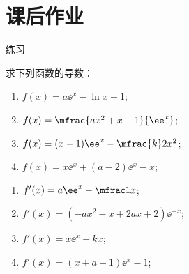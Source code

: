 \newpage
\section{课后作业}
  \begin{exercise}{\heiti 练习}
    \item 求下列函数的导数： \begin{multicols}{2}
          \begin{enumerate}[label=\arabic*)]
            \item $f(x)=a\ee^x-\ln x-1$;
            \vspace{2cm}
            \item $f(x)=\mfrac{ax^2+x-1}{\ee^x}$;
            \vspace{2cm}
            \item $f(x)=(x-1)\ee^x-\mfrac{k}2x^2$;
            \vspace{2cm}
            \item $f(x)=x\ee^x+(a-2)\ee^x-x$;
            \vspace{2cm}
          \end{enumerate}
          \begin{answer}
            \begin{enumerate}[itemindent=1em,listparindent=6em, label=\arabic*)]
              \item $f'(x)=a\ee^x-\mfrac1x$;
              \item $f'(x)=(-ax^2-x+2ax+2)\ee^{-x}$;
              \item $f'(x)=x\ee^x-kx$;
              \item $f'(x)=(x+a-1)\ee^x-1$;
            \end{enumerate}
          \end{answer}
        \end{multicols}
  \end{exercise}
  \vspace{3em}
